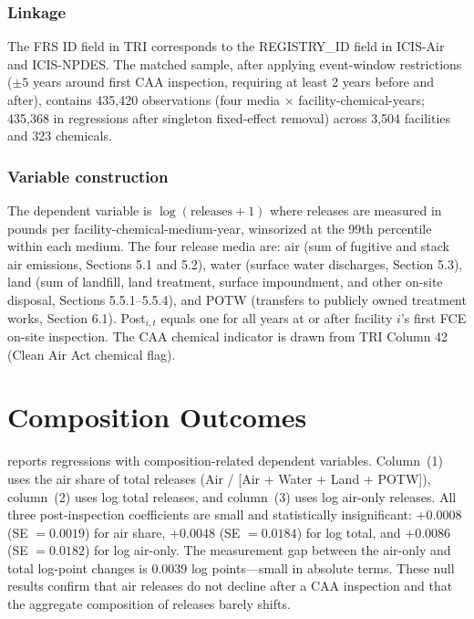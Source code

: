 \documentclass[12pt]{article}
\begin{document}
\subsubsection*{Linkage} The FRS ID field in TRI corresponds to the REGISTRY\_ID field in ICIS-Air and ICIS-NPDES. The matched sample, after applying event-window restrictions ($\pm 5$ years around first CAA inspection, requiring at least 2 years before and after), contains 435,420 observations (four media $\times$ facility-chemical-years; 435,368 in regressions after singleton fixed-effect removal) across 3,504 facilities and 323 chemicals.

\subsubsection*{Variable construction} The dependent variable is $\log(\text{releases} + 1)$ where releases are measured in pounds per facility-chemical-medium-year, winsorized at the 99th percentile within each medium. The four release media are: air (sum of fugitive and stack air emissions, Sections 5.1 and 5.2), water (surface water discharges, Section 5.3), land (sum of landfill, land treatment, surface impoundment, and other on-site disposal, Sections 5.5.1--5.5.4), and POTW (transfers to publicly owned treatment works, Section 6.1). Post$_{i,t}$ equals one for all years at or after facility $i$'s first FCE on-site inspection. The CAA chemical indicator is drawn from TRI Column 42 (Clean Air Act chemical flag).


\section{Composition Outcomes}
\label{sec:composition_appendix}



 reports regressions with composition-related dependent variables. Column~(1) uses the air share of total releases (Air / [Air + Water + Land + POTW]), column~(2) uses log total releases, and column~(3) uses log air-only releases. All three post-inspection coefficients are small and statistically insignificant: $+0.0008$ (SE $= 0.0019$) for air share, $+0.0048$ (SE $= 0.0184$) for log total, and $+0.0086$ (SE $= 0.0182$) for log air-only. The measurement gap between the air-only and total log-point changes is 0.0039 log points---small in absolute terms. These null results confirm that air releases do not decline after a CAA inspection and that the aggregate composition of releases barely shifts.
\end{document}
